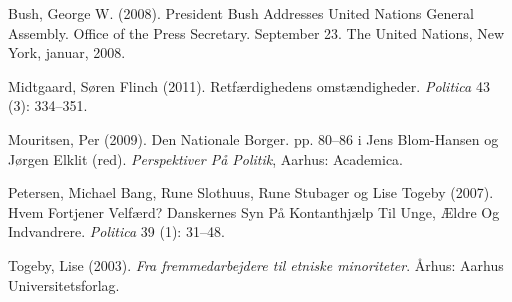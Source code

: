 \documentclass[
  a4paper,
  DIV=11,
  numbers=noendperiod,
  oneside]{scrartcl}
\newlength{\cslhangindent}
\newenvironment{CSLReferences}[2] %
 {\begin{list}{}{%
  \setlength{\itemindent}{0pt}
  \setlength{\leftmargin}{0pt}
  \setlength{\parsep}{0pt}
  \ifodd #1
   \setlength{\leftmargin}{\cslhangindent}
   \setlength{\itemindent}{-1\cslhangindent}
  \fi
  \setlength{\itemsep}{#2\baselineskip}}}
 {\end{list}}
\begin{document}
\label{refs}
\begin{CSLReferences}{1}{1}
Bush, George W. (2008). President {Bush Addresses United Nations General
Assembly}. {Office} of the {Press Secretary}. {September} 23. The United
Nations, New York, januar, 2008.

Midtgaard, Søren Flinch (2011). {Retf{æ}rdighedens omst{æ}ndigheder}.
\emph{Politica} 43 (3): 334--351.

Mouritsen, Per (2009). Den Nationale Borger. pp. 80--86 i Jens
Blom-Hansen og Jørgen Elklit (red). \emph{Perspektiver P{å} Politik},
Aarhus: Academica.

Petersen, Michael Bang, Rune Slothuus, Rune Stubager og Lise Togeby
(2007). Hvem Fortjener Velf{æ}rd? {Danskernes} Syn P{å} Kontanthj{æ}lp
Til Unge, {Æ}ldre Og Indvandrere. \emph{Politica} 39 (1): 31--48.

Togeby, Lise (2003). \emph{{Fra fremmedarbejdere til etniske
minoriteter}}. {Å}rhus: Aarhus Universitetsforlag.

\end{CSLReferences}
\end{document}
